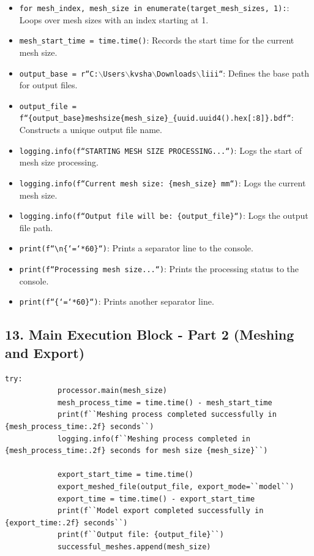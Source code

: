 \documentclass{book}
\begin{document}
\begin{itemize}[leftmargin=*,label=\textbullet]
\begin{itemize}
    \item \texttt{for mesh\_index, mesh\_size in enumerate(target\_mesh\_sizes, 1):}: Loops over mesh sizes with an index starting at 1.
    \item \texttt{mesh\_start\_time = time.time()}: Records the start time for the current mesh size.
    \item \texttt{output\_base = r``C:$\backslash$Users$\backslash$kvsha$\backslash$Downloads$\backslash$liii``}: Defines the base path for output files.
    \item \texttt{output\_file = f``\{output\_base\}meshsize\{mesh\_size\}\_\{uuid.uuid4().hex[:8]\}.bdf``}: Constructs a unique output file name.
    \item \texttt{logging.info(f``STARTING MESH SIZE PROCESSING...``)}: Logs the start of mesh size processing.
    \item \texttt{logging.info(f``Current mesh size: \{mesh\_size\} mm``)}: Logs the current mesh size.
    \item \texttt{logging.info(f``Output file will be: \{output\_file\}``)}: Logs the output file path.
    \item \texttt{print(f``\textbackslash n\{`=`*60\}``)}: Prints a separator line to the console.
    \item \texttt{print(f``Processing mesh size...``)}: Prints the processing status to the console.
    \item \texttt{print(f``\{`=`*60\}``)}: Prints another separator line.
\end{itemize}

\subsection*{13. Main Execution Block - Part 2 (Meshing and Export)}
\begin{lstlisting}[caption={Main Execution Block - Meshing and Export},label={lst:main_2}]
        try:
            processor.main(mesh_size)
            mesh_process_time = time.time() - mesh_start_time
            print(f``Meshing process completed successfully in {mesh_process_time:.2f} seconds``)
            logging.info(f``Meshing process completed in {mesh_process_time:.2f} seconds for mesh size {mesh_size}``)

            export_start_time = time.time()
            export_meshed_file(output_file, export_mode=``model``)
            export_time = time.time() - export_start_time
            print(f``Model export completed successfully in {export_time:.2f} seconds``)
            print(f``Output file: {output_file}``)
            successful_meshes.append(mesh_size)


\end{lstlisting}
\end{itemize}
\end{document}
